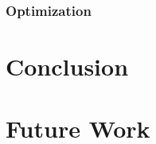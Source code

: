 \documentclass[12pt]{drexelthesis}
\let\Oldsubsection\subsection
\renewcommand{\subsection}{\FloatBarrier\Oldsubsection}
\begin{document}
\subsection{Optimization}



\chapter{Conclusion}
\label{chap:conclusion}


\chapter{Future Work}
\label{chap:future}







\pagebreak
{}
\begin{spacing}{1.0}


\end{spacing}

\newpage
\thispagestyle{empty}

                                                                                                
\end{document}
